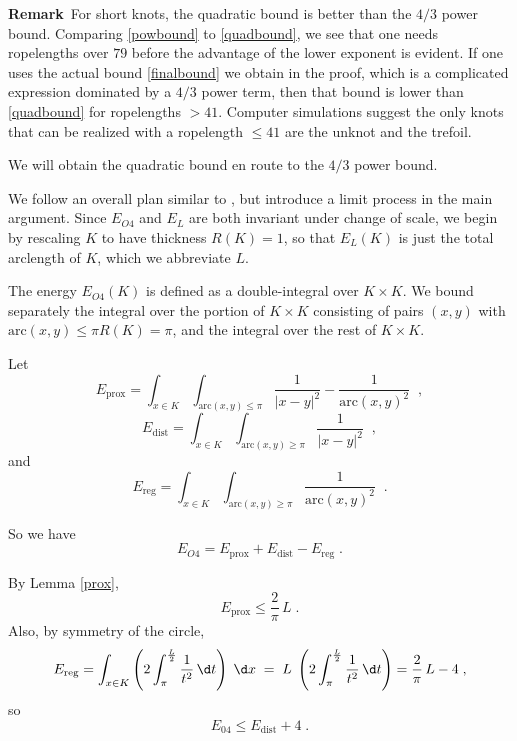 \documentclass{elsart}
\def\E{E}
\begin{document}
{\bf Remark}\,
For short knots, the quadratic bound is
better than the  $4/3$ power bound.  
Comparing \eqref{powbound} to \eqref{quadbound}, we see
that one needs ropelengths over $79$ before the advantage of the
lower exponent is evident.  If one uses the actual bound
\eqref{finalbound} we obtain in the proof, which is a complicated
expression dominated by a $4/3$ power term, then that bound
is lower than \eqref{quadbound} for ropelengths $> 41$.
Computer simulations suggest \cite{stasiakideal,spatial}
the only knots that can be realized
with a ropelength $\leq 41$ are the unknot and the trefoil.

\begin{pf} We will obtain the quadratic bound en
route to the $4/3$ power bound.

We follow an overall plan similar to \cite{BS2,BS3}, but introduce
a limit process in the main argument.
Since
$\E_{O4}$ and
$\E_L$ are both invariant under change of scale, we begin
by rescaling $K$ to have thickness $R(K)=1$, so that
$\E_L(K)$ is just the total arclength of $K$, which we
abbreviate
$L$.

The energy
$\E_{O4}(K)$ is defined as a double-integral over $K
\times K$.  We bound separately the integral over the
portion of $K  \times K$ consisting of pairs $(x,y)$ with
$\mathrm{arc}(x,y)
\leq \pi R(K) = \pi$, and the integral over the rest of $K
\times K$.

Let $$\E_{\mathrm{prox}} = \int\nolimits_{x \in
K}\int\nolimits_{\mathrm{arc}(x,y) \leq \pi}
\frac{1}{|x-y|^2} - \frac{1}{\mathrm{arc}(x,y)^2}  
\;\;,$$ 
$$\E_{\mathrm{dist}} = \int\nolimits_{x \in
K}\int\nolimits_{\mathrm{arc}(x,y) \geq \pi}
\frac{1}{|x-y|^2} \;\;,$$ and
$$\E_{\mathrm{reg}} = \int\nolimits_{x \in
K}\int\nolimits_{\mathrm{arc}(x,y) \geq \pi}
\frac{1}{\mathrm{arc}(x,y)^2}  
\;\;.$$

So we have 
$$\E_{O4}=\E_{\mathrm{prox}}+\E_{\mathrm{dist}}-\E_{\mathrm{reg}}\;.$$

By Lemma \ref{prox}, 
\begin{equation*}
\E_{\mathrm{prox}} \leq \frac{2}{\pi}\,L\;.
\label{eprox}
\end{equation*} Also, by symmetry of the circle, 
\begin{equation*}
\E_{\mathrm{reg}}=
\int_{x \in K} \left(
2\int_{\pi}^{\frac{L}{2}}\frac{1}{t^2}\,\d t \right) \;\d
x\; = 
\;L\;\left( 2\int_{\pi}^{\frac{L}{2}}\frac{1}{t^2}\,\d t
\right) =
\frac{2}{\pi}\,L-4\;,
\label{ereg}
\end{equation*} so
\begin{equation} \label{esummary}
\E_{04} \leq E_{\mathrm{dist}}+4\;.
\end{equation}



\end{pf}
\end{document}
